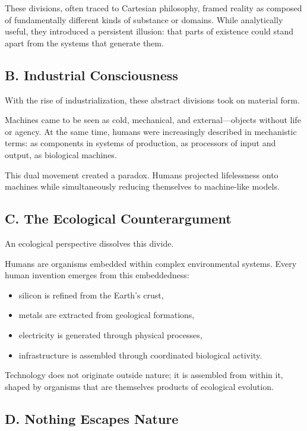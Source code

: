 \documentclass[12pt]{article}
\begin{document}
These divisions, often traced to Cartesian philosophy, framed reality as composed of fundamentally different kinds of substance or domains. While analytically useful, they introduced a persistent illusion: that parts of existence could stand apart from the systems that generate them.

\subsection*{B. Industrial Consciousness}

With the rise of industrialization, these abstract divisions took on material form.

Machines came to be seen as cold, mechanical, and external—objects without life or agency. At the same time, humans were increasingly described in mechanistic terms: as components in systems of production, as processors of input and output, as biological machines.

This dual movement created a paradox. Humans projected lifelessness onto machines while simultaneously reducing themselves to machine-like models.

\subsection*{C. The Ecological Counterargument}

An ecological perspective dissolves this divide.

Humans are organisms embedded within complex environmental systems. Every human invention emerges from this embeddedness:

\begin{itemize}
    \item silicon is refined from the Earth’s crust,
    \item metals are extracted from geological formations,
    \item electricity is generated through physical processes,
    \item infrastructure is assembled through coordinated biological activity.
\end{itemize}

Technology does not originate outside nature; it is assembled from within it, shaped by organisms that are themselves products of ecological evolution.

\subsection*{D. Nothing Escapes Nature}
\end{document}
